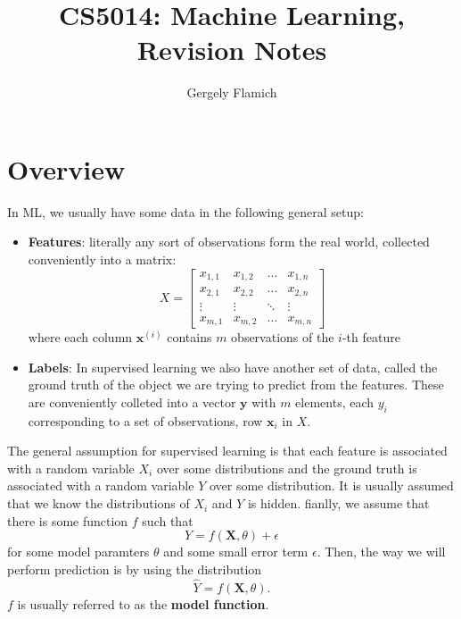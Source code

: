 \documentclass{article}
\title{CS5014: Machine Learning, Revision Notes}
\author{Gergely Flamich}
\renewcommand{\vec}[1]{\mathbf{#1}}
\begin{document}
\maketitle

\section{Overview}
In ML, we usually have some data in the following general setup:
\begin{itemize}
\item \textbf{Features}: literally any sort of observations form the real world,
  collected conveniently into a matrix:
  \[
    X =
    \begin{bmatrix}
      x_{1, 1} & x_{1, 2} & \hdots & x_{1, n} \\
      x_{2, 1} & x_{2, 2} & \hdots & x_{2, n} \\
      \vdots & \vdots & \ddots & \vdots \\
      x_{m, 1} & x_{m, 2} & \hdots & x_{m, n}
    \end{bmatrix}
  \]
  where each column $\vec{x}^{(i)}$ contains $m$ observations of the $i$-th feature
\item \textbf{Labels}: In supervised learning we also have another set of data,
  called the ground truth of the object we are trying to predict from the
  features. These are conveniently colleted into a vector $\vec{y}$ with $m$
  elements, each $y_i$ corresponding to a set of observations, row $\vec{x}_i$
  in $X$.
\end{itemize}
The general assumption for supervised learning is that each feature is associated with a random variable
$X_i$ over some distributions and the ground truth is associated with a random
variable $Y$ over some distribution. It is usually assumed that we know the
distributions of $X_i$ and $Y$ is hidden. fianlly, we assume that there is some
function $f$ such that
\[
  Y = f(\vec{X}, \theta) + \epsilon
\]
for some model paramters $\theta$ and some small error term $\epsilon$.
Then, the way we will perform prediction is by using the distribution
\[
  \hat{Y} = f(\vec{X}, \theta).
\]
$f$ is usually referred to as the \textbf{model function}.
\end{document}
